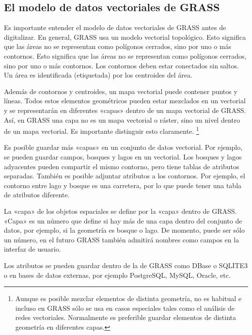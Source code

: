 \subsection{El modelo de datos vectoriales de GRASS}\label{label_vectmodel}

Es importante entender el modelo de datos vectoriales de GRASS antes de digitalizar. En general, GRASS usa un modelo vectorial topológico. Esto significa que las áreas no se representan como polígonos cerrados, sino por uno o más contornos. Esto significa que las áreas no se representan como polígonos cerrados, sino por uno o más contornos.
Los contornos deben estar conectados sin saltos. Un área es identificada (etiquetada) por los centroides del área.

Además de contornos y centroides, un mapa vectorial puede contener puntos y líneas. Todos estos elementos geométricos 
pueden estar mezclados en un vectorial y se representarán en diferentes «capas» dentro de un mapa vectorial de GRASS.
Así, en GRASS una capa no es un mapa vectorial o ráster, sino un nivel dentro de un mapa vectorial. Es importante distinguir esto claramente.
\footnote{Aunque es posible mezclar elementos de distinta geometría, no es habitual e incluso en GRASS sólo se usa en casos especiales
tales como el análisis de redes vectoriales. Normalmente es preferible guardar elementos de distinta geometría en diferentes capas.}

Es posible guardar más «capas» en un conjunto de datos vectorial. Por ejemplo, se pueden guardar campos, bosques y lagos en un vectorial.
Los bosques y lagos adyacentes pueden compartir el mismo contorno, pero tiene tablas de atributos separadas. También es posible
adjuntar atributos a los contornos. Por ejemplo, el contorno entre lago y bosque es una carretera, por lo que puede tener una tabla de atributos diferente.
 
La «capa» de los objetos espaciales se define por la «capa» dentro de GRASS. «Capa» es un número que define si hay más de 
una capa dentro del conjunto de datos, por ejemplo, si la geometría es bosque o lago. De momento, puede ser sólo un número, 
en el futuro GRASS también admitirá nombres como campos en la interfaz de usuario.

Los atributos se pueden guardar dentro de la  de GRASS como DBase o SQLITE3 o en bases de datos externas, por ejemplo PostgreSQL, MySQL, 
Oracle, etc.

